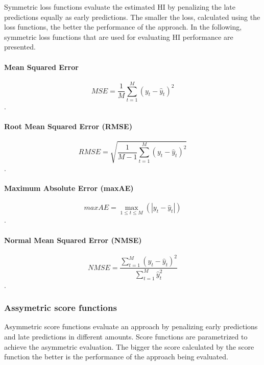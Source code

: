 Symmetric loss functions evaluate the estimated HI by penalizing the late predictions equally as early predictions. The smaller the loss, calculated using the loss functions,
the better the performance of the approach. In the following, symmetric loss
functions that are used for evaluating HI performance are presented.

\paragraph{Mean Squared Error}
\begin{equation}
    MSE = \frac{1}{M} \sum_{t=1}^M(y_t - \hat{y}_t)^2
\end{equation}
\cite{Islam2018CalculatingAH}.

\paragraph{Root Mean Squared Error (RMSE)}
\begin{equation}
    RMSE = \sqrt{\frac{1}{M-1} \sum_{t=1}^M(y_t - \hat{y}_t)^2}
\end{equation}
\cite{DBLP:journals/tie/YangHZXLN16}.

\paragraph{Maximum Absolute Error (maxAE)}
\begin{equation}
    maxAE = \max_{1 \leq t \leq M} (|y_t - \hat{y}_t|)
\end{equation}
\cite{LI2019229}.

\paragraph{Normal Mean Squared Error (NMSE)}
\begin{equation}
    NMSE = \frac{\sum_{t=1}^M (y_t - \hat{y}_t)^2}{\sum_{t=1}^M \hat{y}_t^2}
\end{equation}
\cite{LI2019229}.

\subsubsection{Assymetric score functions}

Asymmetric score functions evaluate an approach by penalizing early predictions and late
predictions in different amounts. Score functions are parametrized to achieve the
asymmetric evaluation. The bigger the score calculated by the score function
the better is the performance of the approach being evaluated.

